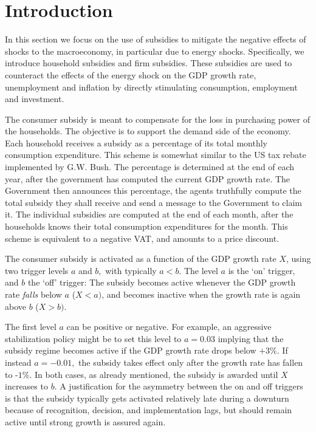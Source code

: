 \section{Introduction}

In this section we focus on the use of subsidies to mitigate the negative
effects of shocks to the macroeconomy, in particular due to energy shocks.
Specifically, we introduce household subsidies and firm subsidies. These
subsidies are used to counteract the effects of the energy shock on the GDP
growth rate, unemployment and inflation by directly stimulating consumption,
employment and investment.

\bigskip The consumer subsidy is meant to compensate for the loss in
purchasing power of the households. The objective is to support the demand
side of the economy. Each household receives a subsidy as a percentage of
its total monthly consumption expenditure. This scheme is somewhat similar
to the US tax rebate implemented by G.W. Bush. The percentage is determined
at the end of each year, after the government has computed the current GDP
growth rate. The Government then announces this percentage, the agents
truthfully compute the total subsidy they shall receive and send a message
to the Government to claim it. The individual subsidies are computed at the
end of each month, after the households knows their total consumption
expenditures for the month. This scheme is equivalent to a negative VAT, and
amounts to a price discount.

\bigskip The consumer subsidy is activated as a function of the GDP growth
rate $X$, using two trigger levels $a$ and $b,$ with typically $a<b$. The
level $a$ is the `on' trigger, and $b$ the `off' trigger: 
The subsidy becomes active whenever the GDP growth rate \textit{falls} below $a$ ($%
X<a)$, and becomes inactive when the growth rate is again above $b$ ($X>b)$.

\bigskip The first level $a$ can be positive or negative. For example, an
aggressive stabilization policy might be to set this level to $a=0.03$
implying that the subsidy regime becomes active if the GDP growth rate drops
below $+3\%$. If instead $a=-0.01,$ the subsidy takes effect only after the
growth rate has fallen to -$1\%$. In both cases, as already mentioned, the
subsidy is awarded until $X$ increases to $b$. A justification for the
asymmetry between the on and off triggers is that the subsidy typically gets
activated relatively late during a downturn because of recognition,
decision, and implementation lags, but should remain active until strong
growth is assured again.

